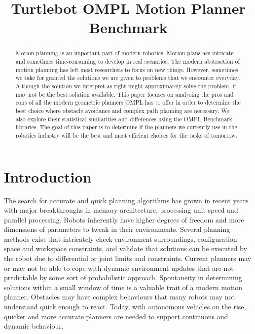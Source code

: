 \documentclass[conference]{IEEEtran} \usepackage[T1]{fontenc} \usepackage[backend=biber, style=ieee]{biblatex}
\begin{document}
\title{Turtlebot OMPL Motion Planner Benchmark}

\author{
}

\maketitle

\begin{abstract}
Motion planning is an important part of modern robotics. Motion plans are intricate and sometimes time-consuming to develop in real scenarios.
The modern abstraction of motion planning has left most researchers to focus on new things. However, sometimes we take for granted the solutions
we are given to problems that we encounter everyday. Although the solution we interpret as right might approximately solve the problem, it may not 
be the best solution available. This paper focuses on analysing the pros and cons of all the modern geometric planners OMPL has to offer in order to
determine the best choice where obstacle avoidance and complex path planning are necessary. We also explore their statistical similarities and differences using the OMPL 
Benchmark libraries. 
The goal of this paper is to determine if the planners we currently use in the robotics industry will be the best and most efficient choices for the 
tasks of tomorrow.
\end{abstract}

\section{Introduction} \label{Introduction}

The search for accurate and quick planning algorithms has grown in recent years with major breakthroughs in memory architecture, processing unit speed and 
parallel processing. Robots inherently have higher degrees of freedom and more dimensions of parameters to tweak in their environments. Several planning methods exist that 
intricately check environment surroundings, configuration space and workspace constraints, and validate
that solutions can be executed by the robot due to differential or joint limits and constraints. Current planners may or may not be able to cope with dynamic environment 
updates that are not predictable by some sort of probabilistic approach. Spontaneity in determining solutions within a small window of time is a valuable trait of a 
modern motion planner. Obstacles may have complex behaviours that many robots may not understand quick enough to react. Today, with autonomous vehicles on the rise, 
quicker and more accurate planners are needed to support continuous and dynamic behaviour.
\end{document}
